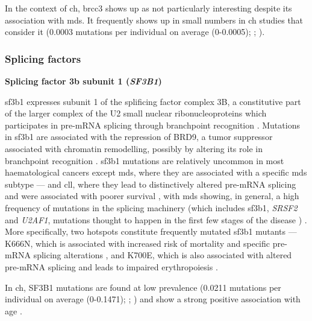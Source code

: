 In the context of \ac{ch}, \ac{brcc3} shows up as not particularly interesting despite its association with \ac{mds}. It frequently shows up in small numbers in \ac{ch} studies that consider it \cite{Jaiswal2014-rl,Genovese2014-eu,Acuna-Hidalgo2017-ng} (0.0003 mutations per individual on average (0-0.0005); ; ). 

\subsubsection{Splicing factors}

\noindent \textbf{Splicing factor 3b subunit 1 (\textit{SF3B1})}

\Ac{sf3b1} expresses subunit 1 of the splificing factor complex 3B, a constitutive part of the larger complex of the U2 small nuclear ribonucleoproteins which participates in pre-mRNA splicing \cite{Fica2013-vn,Kramer1995-mw,Isono2001-yf} through branchpoint recognition \cite{Gozani1998-ox}. Mutations in \ac{sf3b1} are associated with the repression of BRD9, a tumor suppressor associated with chromatin remodelling, possibly by altering its role in branchpoint recognition \cite{Inoue2019-ra}. \ac{sf3b1} mutations are relatively uncommon in most haematological cancers except \ac{mds}, where they are associated with a specific \ac{mds} subtype \cite{Papaemmanuil2011-nr,Hellstrom_Lindberg2015-zs} --- and \ac{cll}, where they lead to distinctively altered pre-mRNA splicing and were associated with poorer survival \cite{Wang2011-wu,Quesada2011-xc}, with \ac{mds} showing, in general, a high frequency of mutations in the splicing machinery (which includes \ac{sf3b1}, \textit{SRSF2} and \textit{U2AF1}, mutations thought to happen in the first few stages of the disease \cite{Haferlach2014-bh,Papaemmanuil2013-yt,Nagata2019-hn}) \cite{Yoshida2011-zp}. More specifically, two hotspots constitute frequently mutated \ac{sf3b1} mutants --- K666N, which is associated with increased risk of mortality and specific pre-mRNA splicing alterations \cite{Dalton2020-mg}, and K700E, which is also associated with altered pre-mRNA splicing and leads to impaired erythropoiesis \cite{Obeng2016-bw}.

In \ac{ch}, SF3B1 mutations are found at low prevalence \cite{Jaiswal2014-rl,Genovese2014-eu,Zink2017-zi,Bolton2020-ct,Coombs2017-ph,McKerrell2015-rl,Acuna-Hidalgo2017-ng,Desai2018-pj,Young2016-du,Young2019-rz} (0.0211 mutations per individual on average (0-0.1471); ; ) and show a strong positive association with age \cite{Bolton2020-ct,Xie2014-np,McKerrell2015-rl}. 

